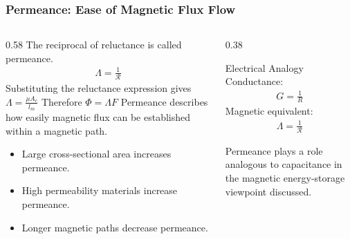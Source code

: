 \begin{frame} 
    \frametitle{Permeance: Ease of Magnetic Flux Flow} 
    \begin{columns} 
        \begin{column}{0.58\textwidth} 
            The reciprocal of reluctance is called permeance. 
            \begin{align} 
                \Lambda = \frac{1}{\mathcal R} 
            \end{align} 
            Substituting the reluctance expression gives 
                $\Lambda = \frac{\mu A_c}{l_m}$ 
            Therefore $
                \Phi=\Lambda F $
                Permeance describes how easily magnetic flux can be established within a magnetic path. 
                \begin{itemize} 
                    \item Large cross-sectional area increases permeance. 
                    \item High permeability materials increase permeance. 
                    \item Longer magnetic paths decrease permeance. 
                \end{itemize} 
            \end{column} 
            \begin{column}{0.38\textwidth} 
                \begin{block}{Electrical Analogy} 
                    Conductance: 
                    \begin{align} 
                        G=\frac{1}{R} 
                    \end{align} 
                    Magnetic equivalent: 
                    \begin{align} 
                        \Lambda=\frac{1}{\mathcal R} 
                    \end{align} 
                \end{block} 
                Permeance plays a role analogous to capacitance in the magnetic energy-storage viewpoint discussed. 
        \end{column} 
    \end{columns} 
\end{frame}

